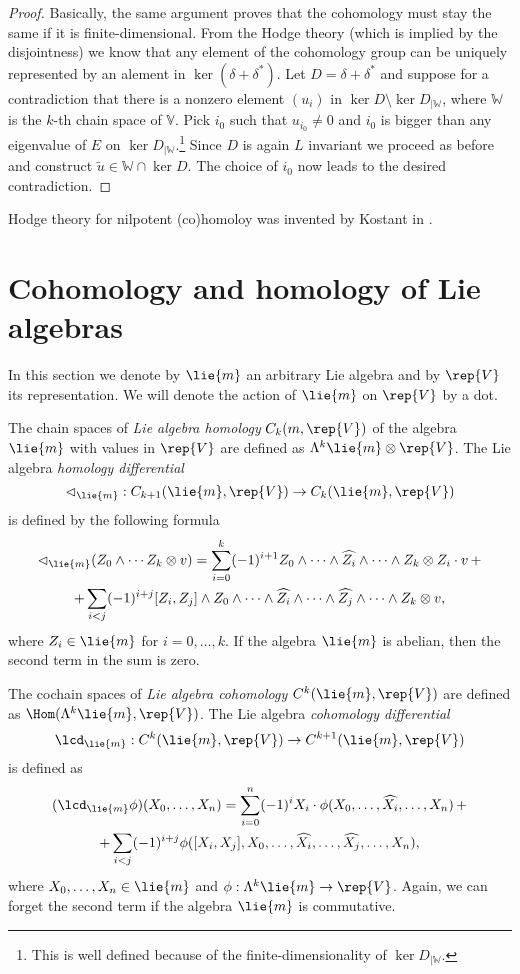 \begin{proof}
Basically, the same argument proves that the cohomology must stay the same if it is finite-dimensional. From the Hodge theory (which is implied by the disjointness) we know that any element of the cohomology group can be uniquely represented by an alement in $\ker (\delta + \delta^*)$. Let $D=\delta + \delta^*$ and suppose for a contradiction that there is a nonzero element $(u_i)$ in $\ker D \setminus \ker D_{|\mathbb{W}}$, where $\mathbb{W}$ is the $k$-th chain space of $\mathbb{V}$. Pick $i_0$ such that $u_{i_0} \neq 0$ and $i_0$ is bigger than any eigenvalue of $E$ on $\ker D_{|\mathbb{W}}$.\footnote{This is well defined because of the finite-dimensionality of $\ker D_{|\mathbb{W}}$.} Since $D$ is again $L$ invariant we proceed as before and construct $\widetilde{u}\in\mathbb{W}\cap\ker D$. The choice of $i_0$ now leads to the desired contradiction.

\end{proof}

Hodge theory for nilpotent (co)homoloy was invented by Kostant in \cite{kostant_lie_1961}.

\section{Cohomology and homology of Lie algebras}

In this section we denote by $\lie{m}$ an arbitrary Lie algebra and by $\rep{V}$ its representation. We will denote the action of $\lie{m}$ on $\rep{V}$ by a dot.

The chain spaces of \emph{Lie algebra homology} $C_k(m,\rep{V})$ of the algebra $\lie{m}$ with values in $\rep{V}$ are defined as $\Lambda^k\lie{m}\otimes\rep{V}$. The Lie algebra \emph{homology differential} \[\lhd_\lie{m} : C_{k+1}(\lie{m},\rep{V}) \to C_k(\lie{m},\rep{V})\] is defined by the following formula
\begin{multline*}
\lhd_\lie{m} (Z_0\wedge\cdots Z_k\otimes v) = \sum_{i=0}^k (-1)^{i+1} Z_0\wedge\cdots\wedge\widehat{Z_i}\wedge\cdots\wedge Z_k\otimes Z_i\cdot v\,  + \\
				      +\sum_{i<j} (-1)^{i+j} [Z_i,Z_j]\wedge Z_0\wedge\cdots\wedge\widehat{Z_i}\wedge\cdots\wedge\widehat{Z_j}\wedge\cdots\wedge Z_k\otimes v,
\end{multline*}
where $Z_i\in\lie{m}$ for $i=0,\ldots,k$. If the algebra $\lie{m}$ is abelian, then the second term in the sum is zero.

The cochain spaces of \emph{Lie algebra cohomology} $C^k(\lie{m},\rep{V})$ are defined as $\Hom(\Lambda^k \lie{m},\rep{V})$. The Lie algebra \emph{cohomology differential} \[\lcd_\lie{m} :  C^k(\lie{m},\rep{V}) \to C^{k+1}(\lie{m},\rep{V})\] is defined as
\begin{multline*}
 (\lcd_\lie{m} \phi)(X_0,\ldots, X_n) = \sum_{i=0}^n (-1)^i X_i \cdot \phi(X_0,\ldots,\widehat{X_i},\ldots, X_n)\, + \\
				+\sum_{i<j} (-1)^{i+j} \phi([X_i,X_j],X_0,\ldots,\widehat{X_i},\ldots,\widehat{X_j},\ldots,X_n),
\end{multline*}
where $X_0,\ldots, X_n \in \lie{m}$ and $\phi:\Lambda^k \lie{m} \to \rep{V}$. Again, we can forget the second term if the algebra $\lie{m}$ is commutative.

